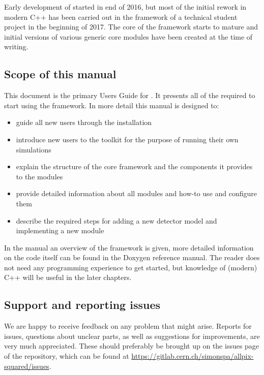 Early development of \apsq started in end of 2016, but most of the initial rework in modern C++ has been carried out in the framework of a technical student project in the beginning of 2017. The core of the framework starts to mature and initial versions of various generic core modules have been created at the time of writing. 

\subsection{Scope of this manual}
This document is the primary Users Guide for \apsq. It presents all of the required to start using the framework. In more detail this manual is designed to:
\begin{itemize}
\item guide all new users through the installation 
\item introduce new users to the toolkit for the purpose of running their own simulations
\item explain the structure of the core framework and the components it provides to the modules
\item provide detailed information about all modules and how-to use and configure them
\item describe the required steps for adding a new detector model and implementing a new module
\end{itemize}

In the manual an overview of the framework is given, more detailed information on the code itself can be found in the Doxygen reference manual. The reader does not need any programming experience to get started, but knowledge of (modern) C++ will be useful in the later chapters.

\subsection{Support and reporting issues}
We are happy to receive feedback on any problem that might arise. Reports for issues, questions about unclear parts, as well as suggestions for improvements, are very much appreciated. These should preferably be brought up on the issues page of the repository, which can be found at \url{https://gitlab.cern.ch/simonspa/allpix-squared/issues}.
